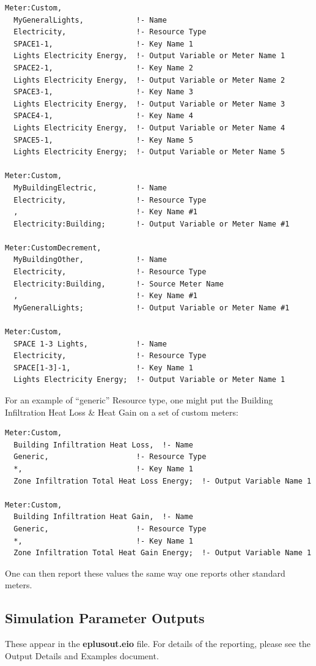 \begin{lstlisting}
Meter:Custom,
  MyGeneralLights,            !- Name
  Electricity,                !- Resource Type
  SPACE1-1,                   !- Key Name 1
  Lights Electricity Energy,  !- Output Variable or Meter Name 1
  SPACE2-1,                   !- Key Name 2
  Lights Electricity Energy,  !- Output Variable or Meter Name 2
  SPACE3-1,                   !- Key Name 3
  Lights Electricity Energy,  !- Output Variable or Meter Name 3
  SPACE4-1,                   !- Key Name 4
  Lights Electricity Energy,  !- Output Variable or Meter Name 4
  SPACE5-1,                   !- Key Name 5
  Lights Electricity Energy;  !- Output Variable or Meter Name 5

Meter:Custom,
  MyBuildingElectric,         !- Name
  Electricity,                !- Resource Type
  ,                           !- Key Name #1
  Electricity:Building;       !- Output Variable or Meter Name #1

Meter:CustomDecrement,
  MyBuildingOther,            !- Name
  Electricity,                !- Resource Type
  Electricity:Building,       !- Source Meter Name
  ,                           !- Key Name #1
  MyGeneralLights;            !- Output Variable or Meter Name #1

Meter:Custom,
  SPACE 1-3 Lights,           !- Name
  Electricity,                !- Resource Type
  SPACE[1-3]-1,               !- Key Name 1
  Lights Electricity Energy;  !- Output Variable or Meter Name 1
\end{lstlisting}

For an example of ``generic'' Resource type, one might put the Building Infiltration Heat Loss \& Heat Gain on a set of custom meters:

\begin{lstlisting}
Meter:Custom,
  Building Infiltration Heat Loss,  !- Name
  Generic,                    !- Resource Type
  *,                          !- Key Name 1
  Zone Infiltration Total Heat Loss Energy;  !- Output Variable Name 1

Meter:Custom,
  Building Infiltration Heat Gain,  !- Name
  Generic,                    !- Resource Type
  *,                          !- Key Name 1
  Zone Infiltration Total Heat Gain Energy;  !- Output Variable Name 1
\end{lstlisting}

One can then report these values the same way one reports other standard meters.

\subsection{Simulation Parameter Outputs}\label{simulation-parameter-outputs}

These appear in the \textbf{eplusout.eio} file. For details of the reporting, please see the Output Details and Examples document.
